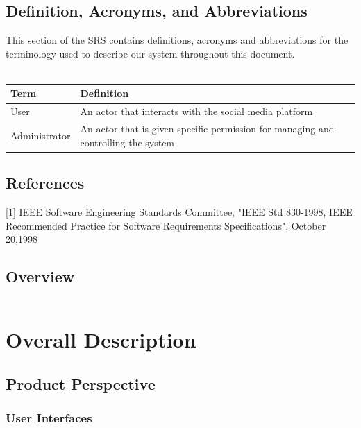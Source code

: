 \documentclass[english]{article}
\begin{document}
		\subsection{Definition, Acronyms, and Abbreviations}
				This section of the SRS contains definitions, acronyms and abbreviations for the terminology used to describe our system throughout this document.
				\\
				\\
				\begin{tabular}{ |p{3cm}|p{9cm}|  }
				\hline
				\textbf{Term} & \textbf{Definition}\\
				\hline
				User & An actor that interacts with the social media platform\\
				\hline
				Administrator & An actor that is given specific permission for managing and controlling the system\\
				\hline
				\end{tabular}

		\subsection{References}
			[1] IEEE Software Engineering Standards Committee, "IEEE Std 830-1998, IEEE Recommended Practice for Software Requirements Specifications", October 20,1998

		\subsection{Overview}
				\begin{tabular}{ |p{3cm}||p{11cm}|  }

				\end{tabular}
	\newpage
	\section{Overall Description}
		
		\subsection{Product Perspective}
			

		

				\subsubsection{User Interfaces}
				
\end{document}
